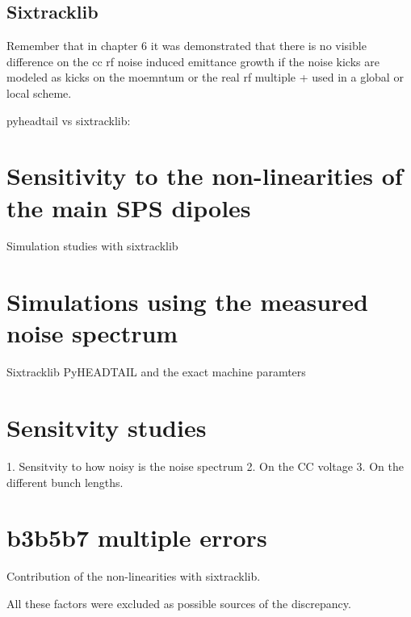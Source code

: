 \subsection{Sixtracklib}

Remember that in chapter 6 it was demonstrated that there is no visible difference on the cc rf noise induced emittance growth if the noise kicks are modeled as kicks on the moemntum or the real rf multiple + used in a global or local scheme.


pyheadtail vs sixtracklib: %

\section{Sensitivity to the non-linearities of the main SPS dipoles}
Simulation studies with sixtracklib

\section{Simulations using the measured noise spectrum}
Sixtracklib PyHEADTAIL and the exact machine paramters

\section{Sensitvity studies}
1. Sensitvity to how noisy is the noise spectrum
2. On the CC voltage
3. On the different bunch lengths. 

\section{b3b5b7 multiple errors}
Contribution of the non-linearities with sixtracklib.


All these factors were excluded as possible sources of the discrepancy.